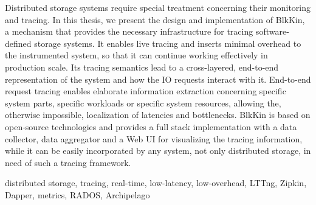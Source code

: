 \begin{abstracten}
Distributed storage systems require special treatment concerning their
monitoring and tracing. In this thesis, we present the design and implementation
of BlkKin, a mechanism that provides the necessary infrastructure for tracing
software-defined storage systems. It enables live tracing and inserts minimal
overhead to the instrumented system, so that it can continue working effectively
in production scale. Its tracing semantics lead to a cross-layered, end-to-end
representation of the system and how the IO requests interact with it.
End-to-end request tracing enables elaborate information extraction concerning
specific system parts, specific workloads or specific system resources, allowing
the, otherwise impossible, localization of latencies and bottlenecks. BlkKin is
based on open-source technologies and provides a full stack implementation with
a data collector, data aggregator and a Web UI for visualizing the tracing
information, while it can be easily incorporated by any system, not only
distributed storage, in need of such a tracing framework.
	\begin{keywordsen}
    distributed storage, tracing, real-time, low-latency, low-overhead, LTTng, 
    Zipkin, Dapper, metrics, RADOS, Archipelago
	\end{keywordsen}
\end{abstracten}

